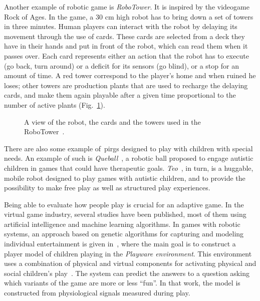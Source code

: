 Another example of robotic game is \textit{RoboTower}. It is inspired by the videogame Rock of Ages. In the game, a 30 cm high robot has to bring down a set of towers in three minutes. Human players can interact with the robot by delaying its movement through the use of cards. These cards are selected from a deck they have in their hands and put in front of the robot, which can read them when it passes over. Each card represents either an action that the robot has to execute (go back, turn around) or a deficit for its sensors (go blind), or a stop for an amount of time. A red tower correspond to the player's home and when ruined he loses; other towers are production plants that are used to recharge the delaying cards, and make them again playable after a given time proportional to the number of active plants (Fig.~\ref{fig:robo_tower}).

\begin{figure}[htp]
  \centering  
  \caption{A view of the robot, the cards and the towers used in the RoboTower~\citep{bonarini_timing_2014}.}
    \label{fig:robo_tower}
\end{figure}

There are also some example of~\glspl{pirg} designed to play with children with special needs. An example of such is \textit{Queball}~\citep{salter_designing_2014}, a robotic ball proposed to engage autistic children in games that could have therapeutic goals. \textit{Teo}~\citep{bonarini_huggable_2016}, in turn, is a huggable, mobile robot designed to play games with autistic children, and to provide the possibility to make free play as well as structured play experiences.

Being able to evaluate how people play is crucial for an adaptive game. In the virtual game industry, several studies have been published, most of them using artificial intelligence and machine learning algorithms. In games with robotic systems, an approach based on genetic algorithms for capturing and modeling individual entertainment is given in~\cite{yannakakis_entertainment_2008}, where the main goal is to construct a player model of children playing in the \textit{Playware environment}. This environment uses a
combination of physical and virtual components for activating physical and social children’s play~\citep{lund_playware_2005}. The system can predict the answers to a question asking which variants of the game are more or less ``fun''. In that work, the model is constructed from physiological signals measured during play.

